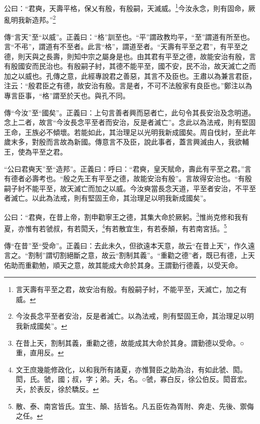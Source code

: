 公曰：“君奭，天壽平格，保乂有殷，有殷嗣，天滅威。\footnote{言天壽有平至之君，故安治有殷。有殷嗣子紂，不能平至，天滅亡，加之有威。}今汝永念，則有固命，厥亂明我新造邦。”\footnote{今汝長念平至者安治，反是者滅亡。以為法戒，則有堅固王命，其治理足以明我新成國矣”。}


{\noindent\zhuan{}\fzbyks 傳“言天”至“以威”。正義曰：“格”訓至也。“平”謂政教均平，“至”謂道有所至也。言“不弔”，謂道有不至者。此言“格”，謂道至者。“天壽有平至之君”，有平至之德，則天與之長壽，則知中宗之屬身是也。由其君有平至之德，故能安治有殷，言有殷國安而民治也。有殷嗣子紂，其德不能平至，國不安，民不治，故天滅亡之而加之以威也。孔傳之意，此經專說君之善惡，其言不及臣也。王肅以為兼言君臣，注云：“殷君臣之有德，故安治有殷。言是者，不可不法殷家有良臣也。”鄭注以為專言臣事，“格”謂至於天也。與孔不同。 \par}

{\noindent\zhuan{}\fzbyks 傳“今汝”至“國矣”。正義曰：上句言善者興而惡者亡，此句令其長安治及念明道。念上二者，故言“今汝長念平至者而安治，反是者滅亡”。念此以為法戒，則有堅固王命，王族必不傾壞。若能如此，其治理足以光明我新成國矣。周自伐紂，至此年歲末多，對殷而言故為新國。傳意言不及臣，說此事者，蓋言興滅由人，我欲輔王，使為平至之君。 \par}

{\noindent\shu{}\fzkt “公曰君奭天”至“造邦”。正義曰：呼曰：“君奭，皇天賦命，壽此有平至之君。”言有德者必壽考也。“殷之先王有平至之德，故能安治有殷”。言故得安治也。“有殷嗣子紂不能平至，故天滅亡而加之以威。今汝奭當長念天道，平至者安治，不平至者滅亡。以此為法戒，則有堅固王命，其治理足以明我新成國矣”。 \par}

公曰：“君奭，在昔上帝，割申勸寧王之德，其集大命於厥躬。\footnote{在昔上天，割制其義，重勸之德，故能成其大命於其身。謂勤德以受命。○重，直用反。}惟尚克修和我有夏，亦惟有若虢叔，有若閎夭，\footnote{文王庶幾能修政化，以和我所有諸夏，亦惟賢臣之助為治，有如此虢、閎。閎，氏。虢，國；叔，字；弟。夭，名。○虢，寡白反，徐公伯反。閎音宏。夭，於表反，徐於驕反。}有若散宜生，有若泰顛，有若南宮括。\footnote{散、泰、南宮皆氏。宜生、顛、括皆名。凡五臣佐為胥附、奔走、先後、禦侮之任。}


{\noindent\zhuan{}\fzbyks 傳“在昔”至“受命”。正義曰：去此未久，但欲遠本天意，故云“在昔上天”，作久遠言之。“割制”謂切割絕斷之意，故云“割制其義”。“重勸之德”者，既已有德，上天佑助而重勸勉，順天之意，故其能成大命於其身。王謂勤行德義，以受天命。 \par}

